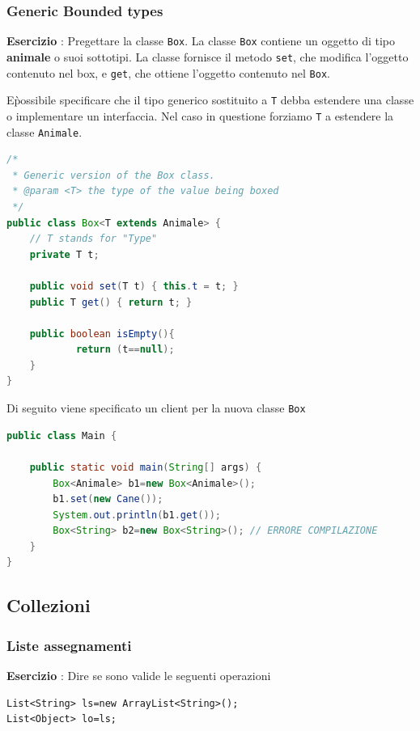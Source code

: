 \documentclass{article}
\begin{document}
\subsubsection{Generic Bounded types}
\begin{framed}
\textbf{Esercizio }: Pregettare la classe \texttt{Box}. La classe \texttt{Box} contiene un oggetto di tipo \textbf{animale} o suoi sottotipi. La classe fornisce il metodo \texttt{set}, che modifica l'oggetto contenuto nel box, e  \texttt{get}, che ottiene l'oggetto contenuto nel \texttt{Box}.
\end{framed}
E\` possibile specificare che il tipo generico sostituito a \texttt{T} debba estendere una classe o implementare un interfaccia. Nel caso in questione forziamo \texttt{T} a estendere la classe \texttt{Animale}.

\begin{lstlisting}[language=Java]
/*
 * Generic version of the Box class.
 * @param <T> the type of the value being boxed
 */
public class Box<T extends Animale> {
    // T stands for "Type"
    private T t;

    public void set(T t) { this.t = t; }
    public T get() { return t; }
    
    public boolean isEmpty(){
    		return (t==null);
    }
}
\end{lstlisting}

Di seguito viene specificato un client per la nuova classe \texttt{Box}

\begin{lstlisting}[language=Java]
public class Main {

	public static void main(String[] args) {
		Box<Animale> b1=new Box<Animale>();
		b1.set(new Cane());
		System.out.println(b1.get());
		Box<String> b2=new Box<String>(); // ERRORE COMPILAZIONE
	}
}
\end{lstlisting}



\subsection{Collezioni}
\subsubsection{Liste assegnamenti}
\begin{framed}
\textbf{Esercizio }: Dire se sono valide le seguenti operazioni
\begin{lstlisting}
List<String> ls=new ArrayList<String>();
List<Object> lo=ls;
\end{lstlisting}
\end{framed}
\end{document}

